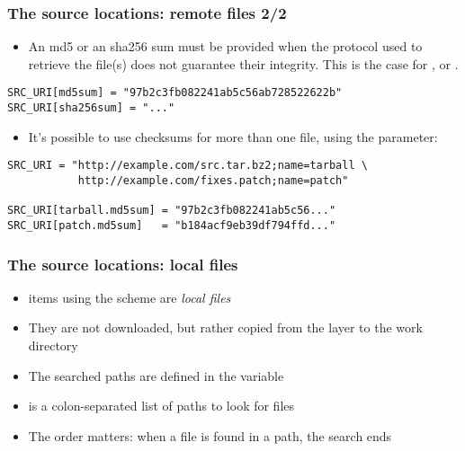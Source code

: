 \begin{frame}[fragile]
  \frametitle{The source locations: remote files 2/2}
  \begin{itemize}
    \item An md5 or an sha256 sum must be provided when the protocol
      used to retrieve the file(s) does not guarantee their integrity.
      This is the case for ,  or .
  \end{itemize}
  \begin{block}{}
    \begin{verbatim}
SRC_URI[md5sum] = "97b2c3fb082241ab5c56ab728522622b"
SRC_URI[sha256sum] = "..."
    \end{verbatim}
  \end{block}
  \begin{itemize}
    \item It's possible to use checksums for more than one file, using
      the  parameter:
  \end{itemize}
  \begin{block}{}
    \begin{verbatim}
SRC_URI = "http://example.com/src.tar.bz2;name=tarball \
           http://example.com/fixes.patch;name=patch"

SRC_URI[tarball.md5sum] = "97b2c3fb082241ab5c56..."
SRC_URI[patch.md5sum]   = "b184acf9eb39df794ffd..."
    \end{verbatim}
  \end{block}
\end{frame}

\begin{frame}
  \frametitle{The source locations: local files}
  \begin{itemize}
    \item {} items using the  scheme are {\em
      local files}
    \item They are not downloaded, but rather copied from the layer to the
      work directory
    \item The searched paths are defined in the 
      variable
    \item {} is a colon-separated list of paths to look for
      files
    \item The order matters: when a file is found in a path, the search
      ends
  \end{itemize}
\end{frame}

